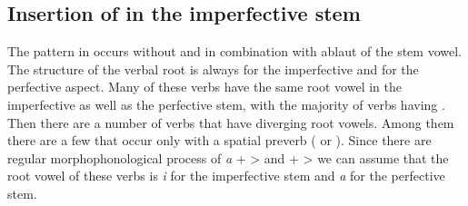 
\subsection{Insertion of  in the imperfective stem}
\label{ssec:Insertion of r in the imperfective stem}

The pattern in  occurs without and in combination with ablaut of the stem vowel. The structure of the verbal root is always  for the imperfective and  for the perfective aspect. Many of these verbs have the same root vowel in the imperfective as well as the perfective stem, with the majority of verbs having . Then there are a number of verbs that have diverging root vowels. Among them there are a few that occur only with a spatial preverb ( or ). Since there are regular morphophonological process of \textit{a} +  >  and  +  >  we can assume that the root vowel of these verbs is \textit{i} for the imperfective stem and \textit{a} for the perfective stem.
%

